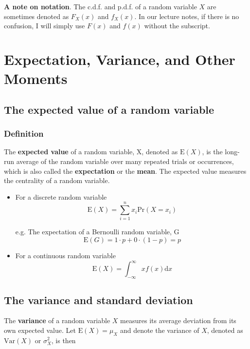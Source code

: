 \documentclass[a4paper,11pt]{article}
\begin{document}
\textbf{A note on notation}. The c.d.f. and p.d.f. of a random variable \(X\) are
sometimes denoted as \(F_X(x)\) and \(f_X(x)\). In our lecture notes, if
there is no confusion, I will simply use \(F(x)\) and \(f(x)\) without the
subscript. 


\section{Expectation, Variance, and Other Moments}
\label{sec:orgc2fbed0}

\subsection{The expected value of a random variable}
\label{sec:org5fdd38b}

\subsubsection*{Definition}
\label{sec:org7e726c5}

The \textbf{expected value} of a random variable, X, denoted as \(\mathrm{E}(X)\), is
the long-run average of the random variable over many repeated
trials or occurrences, which is also called the \textbf{expectation} or the
\textbf{mean}. The expected value measures the centrality of a random
variable.

\begin{itemize}
\item For a discrete random variable
\[ \mathrm{E}(X) = \sum_{i=1}^n x_i \mathrm{Pr}(X = x_i) \]

e.g. The expectation of a Bernoulli random variable, G
  \[ \mathrm{E}(G) = 1 \cdot p + 0 \cdot (1-p) = p \]

\item For a continuous random variable
\[ \mathrm{E}(X) = \int_{-\infty}^{\infty} x f(x) \mathrm{d}x\]
\end{itemize}

\subsection{The variance and standard deviation}
\label{sec:org892dfa6}

The \textbf{variance} of a random variable \(X\) measures its average
deviation from its own expected value. Let \(\mathrm{E}(X) = \mu_X\) and denote
the variance of \(X\), denoted as \(\mathrm{Var}(X)\) or \(\sigma^2_X\), is then
\end{document}

